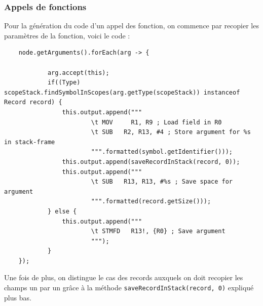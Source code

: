 \documentclass[french,a4paper]{article}
\begin{document}
    \subsubsection{Appels de fonctions}
    Pour la génération du code d'un appel des fonction, on commence par recopier les paramètres de la fonction, voici le code :
    \begin{lstlisting}
    node.getArguments().forEach(arg -> {

            arg.accept(this);
            if((Type) scopeStack.findSymbolInScopes(arg.getType(scopeStack)) instanceof Record record) {
                this.output.append("""
                        \t MOV     R1, R9 ; Load field in R0
                        \t SUB   R2, R13, #4 ; Store argument for %s in stack-frame
                        """.formatted(symbol.getIdentifier()));
                this.output.append(saveRecordInStack(record, 0));
                this.output.append("""
                        \t SUB   R13, R13, #%s ; Save space for argument
                        """.formatted(record.getSize()));
            } else {
                this.output.append("""
                        \t STMFD   R13!, {R0} ; Save argument
                        """);
            }
    });
    \end{lstlisting}

    Une fois de plus, on distingue le cas des records auxquels on doit recopier les champs un par un grâce à la méthode \texttt{saveRecordInStack(record, 0)} expliqué plus bas. \\
\end{document}

